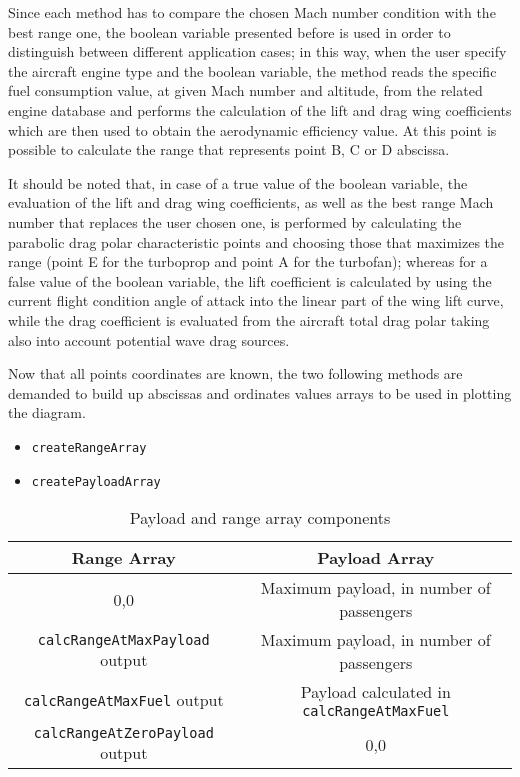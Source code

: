 \bigskip
\noindent
Since each method has to compare the chosen Mach number condition with the best range one, the boolean variable presented before is used in order to distinguish between different application cases; in this way, when the user specify the aircraft engine type and the boolean variable, the method reads the specific fuel consumption value, at given Mach number and altitude, from the related engine database and performs the calculation of the lift and drag wing coefficients which are then used to obtain the aerodynamic efficiency value. At this point is possible to calculate the range that represents point B, C or D abscissa. 

It should be noted that, in case of a true value of the boolean variable, the evaluation of the lift and drag wing coefficients, as well as the best range Mach number that replaces the user chosen one, is performed by calculating the parabolic drag polar characteristic points and choosing those that maximizes the range (point E for the turboprop and point A for the turbofan); whereas for a false value of the boolean variable, the lift coefficient is calculated by using the current flight condition angle of attack into the linear part of the wing lift curve, while the drag coefficient is evaluated from the aircraft total drag polar taking also into account potential wave drag sources.   

\bigskip
\noindent
Now that all points coordinates are known, the two following methods are demanded to build up abscissas and ordinates values arrays to be used in plotting the diagram.

\begin{itemize}
\item\lstinline[language=Java]!createRangeArray!
\item\lstinline[language=Java]!createPayloadArray!
\end{itemize}

\begin{table}[!ht]
\centering
\begin{tabular}{cc}
\toprule
\textbf{Range Array} & \textbf{Payload Array} \\ 
\midrule
0,0	& Maximum payload, in number of passengers \\ [0.2cm]
\lstinline[language=Java]!calcRangeAtMaxPayload! output &	Maximum payload, in number of passengers \\ [0.2cm]
\lstinline[language=Java]!calcRangeAtMaxFuel! output &	Payload calculated in \lstinline[language=Java]!calcRangeAtMaxFuel! \\ [0.2cm]
\lstinline[language=Java]!calcRangeAtZeroPayload! output &	0,0 \\ [0.2cm]
\bottomrule
\end{tabular}
\caption{Payload and range array components}
\label{table:Table3}
\end{table}

